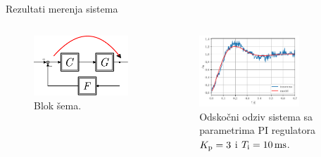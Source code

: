 \documentclass[aspectratio=169,xcolor=dvipsnames]{beamer}
\begin{document}

\begin{frame}{Rezultati merenja sistema}
	\begin{columns}[c]
    \begin{column}{.3\textwidth}
    \begin{figure}
        \centering
        \includegraphics[scale = 0.5]{h/Hsis.pdf}
        \caption{Blok šema.}
    \end{figure}      
    \end{column}
    \begin{column}{.7\textwidth}
    \begin{figure}
        \centering
        \includegraphics[width=0.75\textwidth]{fig/pi/k3t10.pdf}
        \caption{Odskočni odziv sistema sa parametrima PI regulatora  $K_{\rm p} = 3$ i $T_{\rm i} = 10 \, \rm{ms}$.}
    \end{figure}
    \end{column}
\end{columns}
\end{frame}
\end{document}
